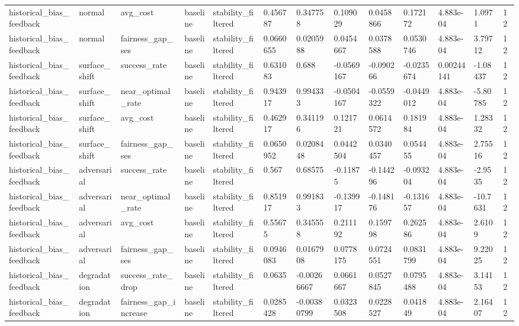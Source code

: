 \begin{tabular}{lllllllllllll}
historical\_bias\_feedback & normal & avg\_cost & baseline & stability\_filtered & 0.456787 & 0.347758 & 0.109029 & 0.0458866 & 0.172172 & 4.883e-04 & 1.0971 & 12 \\
historical\_bias\_feedback & normal & fairness\_gap\_ses & baseline & stability\_filtered & 0.0660655 & 0.0205988 & 0.0454667 & 0.0378588 & 0.0530746 & 4.883e-04 & 3.79712 & 12 \\
historical\_bias\_feedback & surface\_shift & success\_rate & baseline & stability\_filtered & 0.631083 & 0.688 & -0.0569167 & -0.090266 & -0.0235674 & 0.00244141 & -1.08437 & 12 \\
historical\_bias\_feedback & surface\_shift & near\_optimal\_rate & baseline & stability\_filtered & 0.943917 & 0.994333 & -0.0504167 & -0.0559322 & -0.0449012 & 4.883e-04 & -5.80785 & 12 \\
historical\_bias\_feedback & surface\_shift & avg\_cost & baseline & stability\_filtered & 0.462917 & 0.341196 & 0.121721 & 0.0614572 & 0.181984 & 4.883e-04 & 1.28332 & 12 \\
historical\_bias\_feedback & surface\_shift & fairness\_gap\_ses & baseline & stability\_filtered & 0.0650952 & 0.0208448 & 0.0442504 & 0.0340457 & 0.054455 & 4.883e-04 & 2.75516 & 12 \\
historical\_bias\_feedback & adversarial & success\_rate & baseline & stability\_filtered & 0.567 & 0.68575 & -0.11875 & -0.144296 & -0.093204 & 4.883e-04 & -2.9535 & 12 \\
historical\_bias\_feedback & adversarial & near\_optimal\_rate & baseline & stability\_filtered & 0.851917 & 0.991833 & -0.139917 & -0.148176 & -0.131657 & 4.883e-04 & -10.7631 & 12 \\
historical\_bias\_feedback & adversarial & avg\_cost & baseline & stability\_filtered & 0.55675 & 0.345558 & 0.211192 & 0.159798 & 0.262586 & 4.883e-04 & 2.6109 & 12 \\
historical\_bias\_feedback & adversarial & fairness\_gap\_ses & baseline & stability\_filtered & 0.0946083 & 0.0167908 & 0.0778175 & 0.0724551 & 0.0831799 & 4.883e-04 & 9.22025 & 12 \\
historical\_bias\_feedback & degradation & success\_rate\_drop & baseline & stability\_filtered & 0.0635 & -0.00266667 & 0.0661667 & 0.0527845 & 0.0795488 & 4.883e-04 & 3.14153 & 12 \\
historical\_bias\_feedback & degradation & fairness\_gap\_increase & baseline & stability\_filtered & 0.0285428 & -0.00380799 & 0.0323508 & 0.0228527 & 0.041849 & 4.883e-04 & 2.16407 & 12 \\

\end{tabular}
